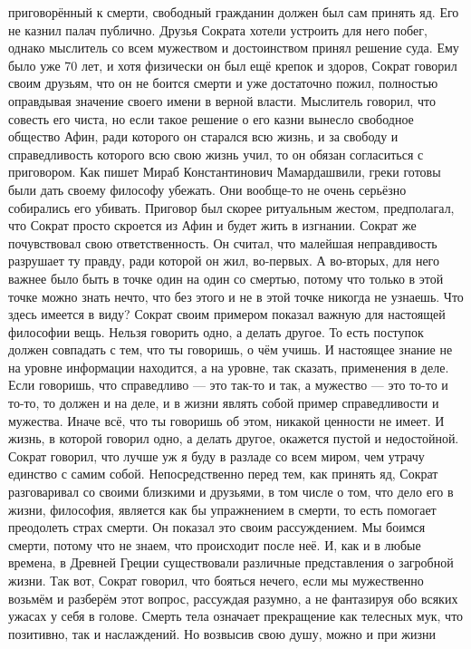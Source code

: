 приговорённый к смерти, свободный гражданин должен был сам принять яд. Его не
казнил палач публично. Друзья Сократа хотели устроить для него побег, однако
мыслитель со всем мужеством и достоинством принял решение суда. Ему было уже 70
лет, и хотя физически он был ещё крепок и здоров, Сократ говорил своим друзьям,
что он не боится смерти и уже достаточно пожил, полностью оправдывая значение
своего имени в верной власти. Мыслитель говорил, что совесть его чиста, но если
такое решение о его казни вынесло свободное общество Афин, ради которого он
старался всю жизнь, и за свободу и справедливость которого всю свою жизнь учил,
то он обязан согласиться с приговором. Как пишет Мираб Константинович
Мамардашвили, греки готовы были дать своему философу убежать. Они вообще-то не
очень серьёзно собирались его убивать. Приговор был скорее ритуальным жестом,
предполагал, что Сократ просто скроется из Афин и будет жить в изгнании. Сократ
же почувствовал свою ответственность. Он считал, что малейшая неправдивость
разрушает ту правду, ради которой он жил, во-первых. А во-вторых, для него
важнее было быть в точке один на один со смертью, потому что только в этой точке
можно знать нечто, что без этого и не в этой точке никогда не узнаешь. Что здесь
имеется в виду? Сократ своим примером показал важную для настоящей философии
вещь. Нельзя говорить одно, а делать другое. То есть поступок должен совпадать с
тем, что ты говоришь, о чём учишь. И настоящее знание не на уровне информации
находится, а на уровне, так сказать, применения в деле. Если говоришь, что
справедливо — это так-то и так, а мужество — это то-то и то-то, то должен и на
деле, и в жизни являть собой пример справедливости и мужества. Иначе всё, что ты
говоришь об этом, никакой ценности не имеет. И жизнь, в которой говорил одно, а
делать другое, окажется пустой и недостойной. Сократ говорил, что лучше уж я
буду в разладе со всем миром, чем утрачу единство с самим собой. Непосредственно
перед тем, как принять яд, Сократ разговаривал со своими близкими и друзьями, в
том числе о том, что дело его в жизни, философия, является как бы упражнением в
смерти, то есть помогает преодолеть страх смерти. Он показал это своим
рассуждением. Мы боимся смерти, потому что не знаем, что происходит после неё.
И, как и в любые времена, в Древней Греции существовали различные представления
о загробной жизни. Так вот, Сократ говорил, что бояться нечего, если мы
мужественно возьмём и разберём этот вопрос, рассуждая разумно, а не фантазируя
обо всяких ужасах у себя в голове. Смерть тела означает прекращение как телесных
мук, что позитивно, так и наслаждений. Но возвысив свою душу, можно и при жизни
